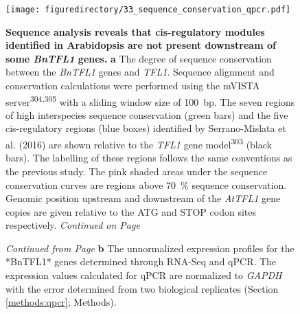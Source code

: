 \documentclass[12pt,]{book}
\begin{document}
\begin{figure}[htbp]
\centering
\texttt{[image: figuredirectory/33\_sequence\_conservation\_qpcr.pdf]}
\caption{\textbf{Sequence analysis reveals that cis-regulatory modules
identified in Arabidopsis are not present downstream of some
\emph{BnTFL1} genes.} \textbf{a} The degree of sequence conservation
between the \emph{BnTFL1} genes and \emph{TFL1}. Sequence alignment and
conservation calculations were performed using the mVISTA
server\textsuperscript{304,305} with a sliding window size of 100~bp.
The seven regions of high interspecies sequence conservation (green
bars) and the five cis-regulatory regions (blue boxes) identified by
Serrano-Mislata et al. (2016) are shown relative to the \emph{TFL1} gene
model\textsuperscript{303} (black bars). The labelling of these regions
follows the same conventions as the previous study. The pink shaded
areas under the sequence conservation curves are regions above 70~\%
sequence conservation. Genomic position upstream and downstream of the
\emph{AtTFL1} gene copies are given relative to the ATG and STOP codon
sites respectively. \emph{Continued on Page
\pageref{figure:233:tfl1conservationlegend}}}\label{figure:233:tfl1conservation}
\end{figure}

\addtocounter{figure}{-1}

\begin{figure} [t!]
\caption{\emph{Continued from Page \pageref{figure:233:tfl1conservation}} \textbf{b} The unnormalized expression profiles for the *BnTFL1* genes determined through RNA-Seq and qPCR. The expression values calculated for qPCR are normalized to \emph{GAPDH} with the error determined from two biological replicates (Section \ref{methods:qpcr}; Methods).}%
\label{figure:233:tfl1conservationlegend}
\end{figure}
\end{document}
